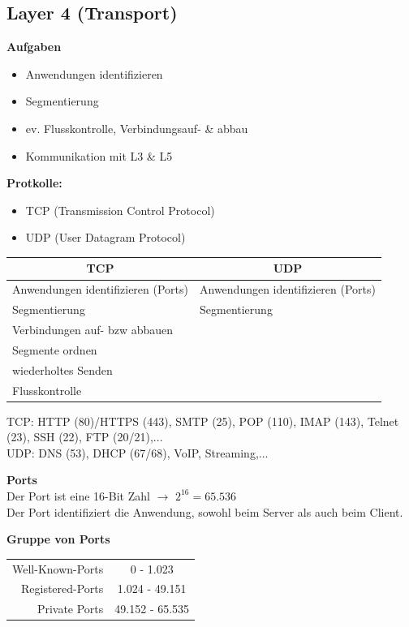 \subsection{Layer 4 (Transport)}
\textbf{Aufgaben}
\begin{itemize}
	\item Anwendungen identifizieren
	\item Segmentierung
	\item ev. Flusskontrolle, Verbindungsauf- \& abbau
	\item Kommunikation mit L3 \& L5
\end{itemize}

\textbf{Protkolle:} 
\begin{itemize}
	\item TCP (Transmission Control Protocol)
	\item UDP (User Datagram Protocol)
\end{itemize}

\begin{table}[H]
	\begin{tabular}{l|l}
		\multicolumn{1}{c|}{TCP} & \multicolumn{1}{c}{UDP} \\
		\hline
		Anwendungen identifizieren (Ports) & Anwendungen identifizieren (Ports) \\
		Segmentierung & Segmentierung \\
		Verbindungen auf- bzw abbauen &  \\
		Segmente ordnen &  \\
		wiederholtes Senden &  \\
		Flusskontrolle & 
	\end{tabular}
\end{table}

TCP: HTTP (80)/HTTPS (443), SMTP (25), POP (110), IMAP (143), Telnet (23), SSH (22), FTP (20/21),... \\
UDP: DNS (53), DHCP (67/68), VoIP, Streaming,...

\textbf{Ports} \\
Der Port ist eine 16-Bit Zahl $\rightarrow$ $2^{16} = 65.536$ \\
Der Port identifiziert die Anwendung, sowohl beim Server als auch beim Client.

\textbf{Gruppe von Ports}
\begin{table}[H]
	\begin{tabular}{rc}
		Well-Known-Ports & 0 - 1.023 \\
		Registered-Ports & 1.024 - 49.151 \\
		Private Ports & 49.152 - 65.535
	\end{tabular}
\end{table}

